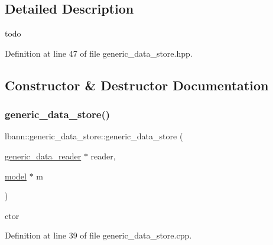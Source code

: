 \subsection{Detailed Description}
todo 

Definition at line 47 of file generic\+\_\+data\+\_\+store.\+hpp.



\subsection{Constructor \& Destructor Documentation}
\mbox{\label{classlbann_1_1generic__data__store_acbcd88161c06f4bb9a70bbae857d4ee0}} 
\subsubsection{\texorpdfstring{generic\+\_\+data\+\_\+store()}{generic\_data\_store()}\hspace{0.1cm}{\footnotesize\ttfamily [1/2]}}
{\footnotesize\ttfamily lbann\+::generic\+\_\+data\+\_\+store\+::generic\+\_\+data\+\_\+store (\begin{DoxyParamCaption}\item[{\hyperlink{classlbann_1_1generic__data__reader}{generic\+\_\+data\+\_\+reader} $\ast$}]{reader,  }\item[{\hyperlink{classlbann_1_1model}{model} $\ast$}]{m }\end{DoxyParamCaption})}



ctor 



Definition at line 39 of file generic\+\_\+data\+\_\+store.\+cpp.


